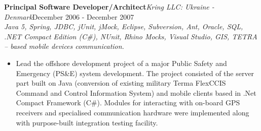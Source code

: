 \documentclass{res}
\newcommand{\jobdes}[4]{\needspace{3\baselineskip} %
{\noindent \bf #3\hspace{2ex}}{{\em \small #1}}{\hfill #2}\\{{\it \small #4.}}}
\begin{document}
\begin{resume}
\jobdes {Kring LLC: Ukraine - Denmark}{December 2006 - December 2007}{Principal Software Developer/Architect}
{Java 5, Spring, JDBC, jUnit, jMock, Eclipse, Subversion, Ant, Oracle, SQL, .NET Compact Edition (C\#), NUnit, Rhino Mocks, Visual Studio, GIS, TETRA – based mobile devices communication}
\begin{itemize} \itemsep -2pt %
 \item Lead the offshore development project of a major Public Safety and Emergency (PS\&E) system development. The project consisted of the server part built on Java (conversion of existing military Terma FlexCCIS Command and Control Information System) and mobile clients based in .Net Compact Framework (C\#). Modules for interacting with on-board GPS receivers and specialised communication hardware were implemented along with purpose-built integration testing facility.
\end{itemize}


\end{resume}
\end{document}
